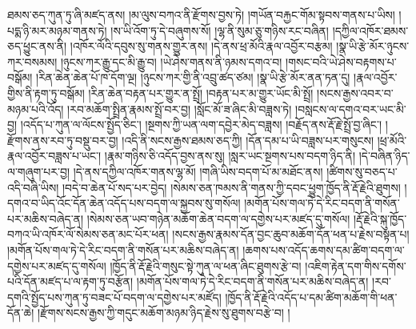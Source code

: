 ཐམས་ཅད་ཀུན་ཏུ་ཞི་མཛད་ནས། །མ་ལུས་བཀའ་ནི་རྫོགས་བྱས་ཏེ། །གཡོན་བརྐྱང་གོམ་སྟབས་གནས་པ་ཡིས། །པདྨ་ཉི་མར་མཉམ་གནས་ཏེ། །ས་ཡི་འོག་ཏུ་དེ་བཞུགས་སོ། །ལྷ་ནི་སུམ་ཅུ་གཉིས་རང་བཞིན། །དཀྱིལ་འཁོར་ཐམས་ཅད་ཕྱུང་ནས་ནི། །འཁོར་ལོའི་དབུས་སུ་གནས་གྱུར་ནས། །དེ་ནས་ཕྲ་མོའི་རྣལ་འབྱོར་བརྩམ། །སྣ་ཡི་རྩེ་མོར་ཉུངས་ཀར་བསམས། །ཉུངས་ཀར་རྒྱུ་དང་མི་རྒྱུ་བ། །ཡེ་ཤེས་གནས་ནི་ཉམས་དགའ་བ། །གསང་བའི་ཡེ་ཤེས་བརྟགས་པ་བསྒོམ། །རིན་ཆེན་ཆེན་པོ་ཁ་དོག་ལྔ། །ཉུངས་ཀར་གྱི་ནི་འབྲུ་ཚད་ཙམ། །སྣ་ཡི་རྩེ་མོར་ནན་ཏན་དུ། །རྣལ་འབྱོར་གྱིས་ནི་རྟག་ཏུ་བསྒོམ། །རིན་ཆེན་བརྟན་པར་གྱུར་ན་སྤྲོ། །བརྟན་པར་མ་གྱུར་ཡོང་མི་སྤྲོ། །སངས་རྒྱས་འབར་བ་མཉམ་པའི་འོད། །རབ་མཆོག་སྤྲིན་རྣམས་སྤྲོ་བར་བྱ། །སློང་མོ་ཟ་ཞིང་མི་བཟླས་ཏེ། །བསླངས་ལ་དགའ་བར་ཡང་མི་བྱ། །འདོད་པ་ཀུན་ལ་ལོངས་སྤྱོད་ཅིང་། །སྔགས་ཀྱི་ཡན་ལག་དབྱེར་མེད་བཟླས། །བརྗོད་ནས་རྡོ་རྗེ་སྤྲོ་བྱ་ཞིང་། །རྫོགས་ནས་རབ་ཏུ་བསྡུ་བར་བྱ། །འདི་ནི་སངས་རྒྱས་ཐམས་ཅད་ཀྱི། །དོན་དམ་པ་ཡི་བཟླས་པར་གསུངས། །ཕྲ་མོའི་རྣལ་འབྱོར་བཟླས་པ་ཡང་། །རྣམ་གཉིས་ཅི་འདོད་བྱས་ནས་སུ། །སླར་ཡང་སྔགས་པས་བདག་ཉིད་ནི། །དེ་བཞིན་ཉིད་ལ་གཞུག་པར་བྱ། །དེ་ནས་དཀྱིལ་འཁོར་གནས་ལྷ་མོ། །གཞི་ཡིས་བདག་པོ་མ་མཐོང་ནས། །ཚིགས་སུ་བཅད་པ་འདི་བཞི་ཡིས། །བདེ་བ་ཆེན་པོ་སད་པར་བྱེད། །སེམས་ཅན་ཁམས་ནི་གནས་ཀྱི་དབང་ཕྱུག་ཁྱོད་ནི་རྡོ་རྗེའི་ཐུགས། །དགའ་བ་ཡིད་འོང་དོན་ཆེན་འདོད་པས་བདག་ལ་སྐྱབས་སུ་གསོལ། །མགོན་པོས་གལ་ཏེ་དེ་རིང་བདག་ནི་གསོན་པར་མཆིས་བཞེད་ན། །སེམས་ཅན་ཡབ་གཉེན་མཆོག་ཆེན་བདག་ལ་དགྱེས་པར་མཛད་དུ་གསོལ། །རྡོ་རྗེའི་སྐུ་ཁྱོད་བཀའ་ཡི་འཁོར་ལོ་སེམས་ཅན་མང་པོར་ཕན། །སངས་རྒྱས་རྣམས་དོན་བྱང་ཆུབ་མཆོག་དོན་ཕན་པ་རྗེས་བསྟན་པ། །མགོན་པོས་གལ་ཏེ་དེ་རིང་བདག་ནི་གསོན་པར་མཆིས་བཞེད་ན། །ཆགས་པས་འདོད་ཆགས་དམ་ཚིག་བདག་ལ་དགྱེས་པར་མཛད་དུ་གསོལ། །ཁྱོད་ནི་རྡོ་རྗེའི་གསུང་སྟེ་ཀུན་ལ་ཕན་ཞིང་ཐུགས་རྩེ་བ། །འཇིག་རྟེན་དག་གིས་དགོས་པའི་དོན་མཛད་པ་ལ་རྟག་ཏུ་བརྩོན། །མགོན་པོས་གལ་ཏེ་དེ་རིང་བདག་ནི་གསོན་པར་མཆིས་བཞེད་ན། །རབ་དགའི་སྤྱོད་པས་ཀུན་ཏུ་བཟང་པོ་བདག་ལ་དགྱེས་པར་མཛོད། །ཁྱོད་ནི་རྡོ་རྗེའི་འདོད་པ་དམ་ཚིག་མཆོག་གི་ཕན་དོན་ཆེ། །རྫོགས་སངས་རྒྱས་ཀྱི་གདུང་མཆོག་མཉམ་ཉིད་རྗེས་སུ་ཐུགས་བརྩེ་བ། །
